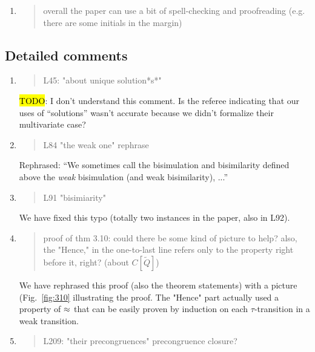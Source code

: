\begin{enumerate}
\item \begin{quote}
    overall the paper can use a bit of spell-checking and proofreading (e.g. there are some initials in the margin)
  \end{quote}


\end{enumerate}

\subsection*{Detailed comments}

\begin{enumerate}
\item \begin{quote}
    L45: "about unique solution*s*"
  \end{quote}

  \hl{TODO}: I don't understand this comment. Is the referee indicating
  that our uses of ``solutions'' wasn't accurate because we didn't
  formalize their multivariate case?
  
\item \begin{quote}
    L84 "the weak one" rephrase
  \end{quote}

  Rephrased: ``We sometimes call the bisimulation and bisimilarity defined above
the \emph{weak} bisimulation (and weak bisimilarity), ...''
  
\item \begin{quote}
    L91 "bisimiarity"
  \end{quote}

  We have fixed this typo (totally two instances in the paper, also in L92).
  
\item \begin{quote}
    proof of thm 3.10: could there be some kind of picture to help? also, the "Hence," in the one-to-last line refers only to the property right before it, right? (about $C[\tilde{Q}]$)
  \end{quote}

  We have rephrased this proof (also the theorem statements) with a
  picture (Fig.~\ref{fig:310} illustrating the proof. The "Hence" part
  actually used a property of $\approx$ that can be easily proven by induction
  on each $\tau$-transition in a weak transition.
  
\item \begin{quote}
    L209: "their precongruences" precongruence closure?
  \end{quote}


\end{enumerate}
